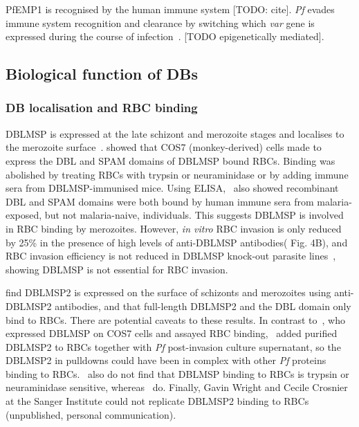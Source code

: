 \documentclass[12pt]{article}
\begin{document}
PfEMP1 is recognised by the human immune system [TODO: cite]. \textit{Pf} evades immune
system recognition and clearance by switching which \textit{var} gene is expressed during
the course of infection~\cite{Roberts1992}. [TODO epigenetically mediated].

\subsection{Biological function of DBs}
\subsubsection{DB localisation and RBC binding}

DBLMSP is expressed at the late schizont and merozoite stages and localises to the merozoite surface~\cite{wickramarachchi_novel_2009}.
\cite{wickramarachchi_novel_2009} showed that COS7 (monkey-derived) cells made to
express the DBL and SPAM domains of DBLMSP bound RBCs. Binding was
abolished by treating RBCs with trypsin or neuraminidase or by adding immune sera
from DBLMSP-immunised mice. Using ELISA,~\cite{wickramarachchi_novel_2009} also showed
recombinant DBL and SPAM domains were both bound by human immune sera from
malaria-exposed, but not malaria-naive, individuals. This suggests DBLMSP is involved in
RBC binding by merozoites. However, \textit{in vitro} RBC invasion is only reduced by
25\% in the presence of high levels of anti-DBLMSP antibodies(\cite{Sakamoto2012} Fig. 4B), and RBC
invasion efficiency is not reduced in DBLMSP knock-out parasite lines~\cite{Sakamoto2012,Crosnier2016}, showing DBLMSP is not
essential for RBC invasion.

\cite{Hodder2012} find DBLMSP2 is expressed on
the surface of schizonts and merozoites using anti-DBLMSP2 antibodies, and that
full-length DBLMSP2 and the DBL domain only bind to RBCs. There are potential 
caveats to these results. In contrast to~\cite{wickramarachchi_novel_2009}, who
expressed DBLMSP on COS7 cells and assayed RBC binding,~\cite{Hodder2012} added purified
DBLMSP2 to RBCs together with \textit{Pf} post-invasion culture supernatant,
so the DBLMSP2 in pulldowns could have been in complex with other \textit{Pf} proteins
binding to RBCs.~\cite{Hodder2012} also do not find that DBLMSP binding to RBCs is
trypsin or neuraminidase sensitive, whereas~\cite{wickramarachchi_novel_2009} do.
Finally, Gavin Wright and Cecile Crosnier at the Sanger Institute could not replicate
DBLMSP2 binding to RBCs (unpublished, personal communication). 
\end{document}
